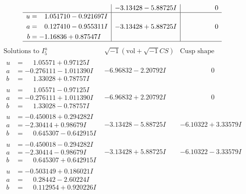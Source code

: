 \documentclass[1p]{elsarticle_modified}
\theoremstyle{definition}
\newcommand{\I}{\sqrt{-1}}
\begin{document}
$$\begin{array}{c|c|c}
 & -3.13428 - 5.88725 I & \phantom{-0.000000 } 0 \\ \hline\begin{aligned}
u &= \phantom{-}1.051710 - 0.921697 I \\
a &= \phantom{-}0.127410 - 0.955311 I \\
b &= -1.16836 + 0.87547 I\end{aligned}
 & -3.13428 + 5.88725 I & \phantom{-0.000000 } 0\\
 \hline 
 \end{array}$$\newpage$$\begin{array}{c|c|c}  
\text{Solutions to }I^u_{5}& \I (\text{vol} + \sqrt{-1}CS) & \text{Cusp shape}\\
 \hline 
\begin{aligned}
u &= \phantom{-}1.05571 + 0.97125 I \\
a &= -0.276111 - 1.011390 I \\
b &= \phantom{-}1.33028 + 0.78757 I\end{aligned}
 & -6.96832 - 2.20792 I & \phantom{-0.000000 } 0 \\ \hline\begin{aligned}
u &= \phantom{-}1.05571 - 0.97125 I \\
a &= -0.276111 + 1.011390 I \\
b &= \phantom{-}1.33028 - 0.78757 I\end{aligned}
 & -6.96832 + 2.20792 I & \phantom{-0.000000 } 0 \\ \hline\begin{aligned}
u &= -0.450018 + 0.294282 I \\
a &= -2.30414 + 0.98679 I \\
b &= \phantom{-}0.645307 - 0.642915 I\end{aligned}
 & -3.13428 - 5.88725 I & -6.10322 + 3.33579 I \\ \hline\begin{aligned}
u &= -0.450018 - 0.294282 I \\
a &= -2.30414 - 0.98679 I \\
b &= \phantom{-}0.645307 + 0.642915 I\end{aligned}
 & -3.13428 + 5.88725 I & -6.10322 - 3.33579 I \\ \hline\begin{aligned}
u &= -0.503149 + 0.186021 I \\
a &= \phantom{-}0.28442 - 2.60224 I \\
b &= \phantom{-}0.112954 + 0.920226 I\end{aligned}

\end{array}$$
\end{document}
